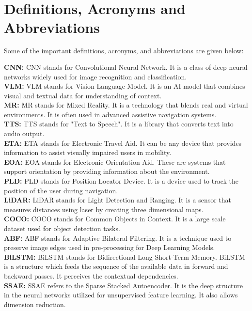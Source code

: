 \documentclass{FastFyp}
\begin{document}
\section{Definitions, Acronyms and Abbreviations}

Some of the important definitions, acronyms, and abbreviations are given below:


    \textbf{CNN:} CNN stands for Convolutional Neural Network. It is a class of deep neural networks widely used for image recognition and classification.\\
    \textbf{VLM:} VLM stands for Vision Language Model. It is an AI model that combines visual and textual data for understanding of context.\\
    \textbf{MR:} MR stands for Mixed Reality. It is a technology that blends real and virtual environments. It is often used in advanced assistive navigation systems.\\
    \textbf{TTS:} TTS stands for "Text to Speech". It is a library that converts text into audio output.\\
    \textbf{ETA:} ETA stands for Electronic Travel Aid. It can be any device that provides information to assist visually impaired users in mobility.\\
    \textbf{EOA:} EOA stands for Electronic Orientation Aid. These are systems that support orientation by providing information about the environment.\\
    \textbf{PLD:} PLD stands for Position Locator Device. It is a device used to track the position of the user during navigation.\\
    \textbf{LiDAR:} LiDAR stands for Light Detection and Ranging. It is a sensor that measures distances using laser by creating three dimensional maps.\\
    \textbf{COCO:} COCO stands for Common Objects in Context. It is a large scale dataset used for object detection tasks.\\
    \textbf{ABF:} ABF stands for Adaptive Bilateral Filtering. It is a technique used to preserve image edges used in pre-processing for Deep Learning Models.\\
    \textbf{BiLSTM:}  BiLSTM stands for Bidirectional Long Short-Term Memory. BiLSTM is a structure which feeds the sequence of the available data in forward and backward passes. It perceives the contextual dependencies.\\
    \textbf{SSAE:} SSAE refers to the Sparse Stacked Autoencoder. It is the deep structure in the neural networks utilized for unsupervised feature learning. It also allows dimension reduction.\\
\end{document}
